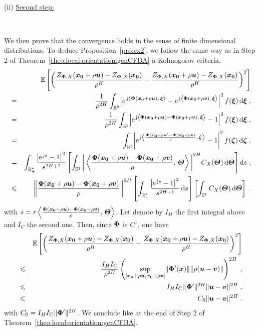 \documentclass{elsarticle}
\begin{document}
\

\noindent (ii) \underline{Second step:} 

\

We then prove that the convergence holds in the sense of finite dimensional distributions. To deduce Proposition~\ref{pro:ex2}, we follow the same way as in Step 2 of Theorem~\ref{theo:local:orientation:genCFBA} a Kolmogorov criteria.
\begin{eqnarray*}
&&\mathbb{E}\left[\left(\frac{Z_{\ope{\Phi},X}(\vect{x_0}+\rho \vect{u})-Z_{\ope{\Phi},X}(\vect{x_0})}{\rho^H}-\frac{Z_{\ope{\Phi},X}(\vect{x_0}+\rho \vect{u})-Z_{\ope{\Phi},X}(\vect{x_0})}{\rho^H}\right)^2\right]\\
&=&\frac{1}{\rho^{2H}} \int_{\mathbb{R}^2} \abs{\expj{\ip{\ope{\Phi}(\vect{x_0}+\rho \vect{u})}{\vect{\xi}}}-\expj{\ip{\ope{\Phi}(\vect{x_0}+\rho \vect{v})}{\vect{\xi}}}}^2f(\vect{\xi})\dif \vect{\xi}\;,\\
&=&\frac{1}{\rho^{2H}} \int_{\mathbb{R}^2} \abs{\expj{\ip{\ope{\Phi}(\vect{x_0}+\rho \vect{u})-\ope{\Phi}(\vect{x_0}+\rho \vect{v})}{\vect{\xi}}}-1}^2f(\vect{\xi})\dif \vect{\xi}\;,\\
&=&\int_{\mathbb{R}^2} \abs{\expj{\ip{\frac{\ope{\Phi}(\vect{x_0}+\rho \vect{u})-\ope{\Phi}(\vect{x_0}+\rho \vect{v})}{\rho}}{\vect{\zeta}}}-1}^2f(\vect{\zeta})\dif \vect{\zeta}\;,\\
&=&\int_{\mathbb{R}_+^{\ast}} \frac{ \abs{\expj{s}-1}^2}{s^{2H+1}}\left[ \int_{ \mathbb{S}^1}^{} \bigg| \ip{\frac{\ope{\Phi}(\vect{x_0}+\rho \vect{u})-\ope{\Phi}(\vect{x_0}+\rho \vect{v})}{\rho}}{\vect{\Theta}}\bigg|^{2H} C_X(\vect{\Theta})\dif \vect{\Theta}\right]\dif s\;,\\
&\leq & \bigg\| \frac{\ope{\Phi}(\vect{x_0}+\rho \vect{u})-\ope{\Phi}(\vect{x_0}+\rho \vect{v})}{\rho}\bigg\|^{2H}\left[ \int_{\mathbb{R}_+^{\ast}} \frac{ \abs{\expj{s}-1}^2}{s^{2H+1}}\dif s\right]\left[ \int_{ \mathbb{S}^1}^{}C_X(\vect{\Theta})\dif \vect{\Theta}\right]\;.
\end{eqnarray*}
with $s=r\left \langle \frac{\mathbf{\Phi}(\bm{x_0}+\rho \bm{u})-\mathbf{\Phi}(\bm{x_0}+\rho \bm{v})}{\rho},\, \bm{\Theta}\right \rangle$. Let denote by $I_H$ the first integral above and $I_C$ the second one. Then, since $\mathbf{\Phi}$ is $C^1$, one have
\begin{eqnarray*}
&&\mathbb{E}\left[\left(\frac{Z_{\mathbf{\Phi},X}(\bm{x_0}+\rho \bm{u})-Z_{\mathbf{\Phi},X}(\bm{x_0})}{\rho^H}-\frac{Z_{\mathbf{\Phi},X}(\bm{x_0}+\rho \bm{u})-Z_{\mathbf{\Phi},X}(\bm{x_0})}{\rho^H}\right)^2\right]\\
&\leqslant &\frac{I_H I_C}{\rho^{2H}} \left(\displaystyle \sup_{[\bm{x_0}+\rho \bm{u},\bm{x_0}+\rho \bm{v}]} \lVert \mathbf{\Phi}'(\bm{x})\rVert \lVert \rho (\bm{u}-\bm{v})\rVert\right)^{2H}\;,\\
&\leqslant &I_H I_C \lVert \mathbf{\Phi}'\rVert^{2H} \lVert \bm{u}-\bm{v}\rVert^{2H}\;,\\
&\leqslant  &C_0 \lVert \bm{u}-\bm{v}\rVert^{2H}\;.
\end{eqnarray*}
with $C_0=I_H I_C \lVert \mathbf{\Phi}'\rVert^{2H}$. We conclude like at the end of Step 2 of Theorem~\ref{theo:local:orientation:genCFBA}.
\end{document}
